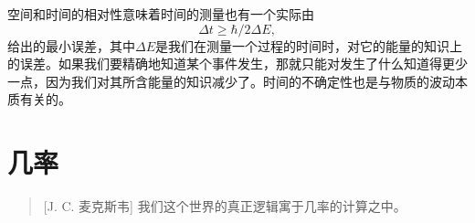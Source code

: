 \documentclass[11pt,oneside]{book}
\begin{document}
\begin{common-format}
空间和时间的相对性意味着时间的测量也有一个实际由
\begin{equation*}
\Delta t\geq\hbar/2\Delta E,
\end{equation*}
给出的最小误差，其中$\Delta E$是我们在测量一个过程的时间时，对它的能量的知识上的误差。如果我们要精确地知道某个事件发生，那就只能对发生了什么知道得更少一点，因为我们对其所含能量的知识减少了。时间的不确定性也是与物质的波动本质有关的。



\chapter{几率}
\begin{quote}[J. C. 麦克斯韦]
我们这个世界的真正逻辑寓于几率的计算之中。
\end{quote}






\end{common-format}
\end{document}
